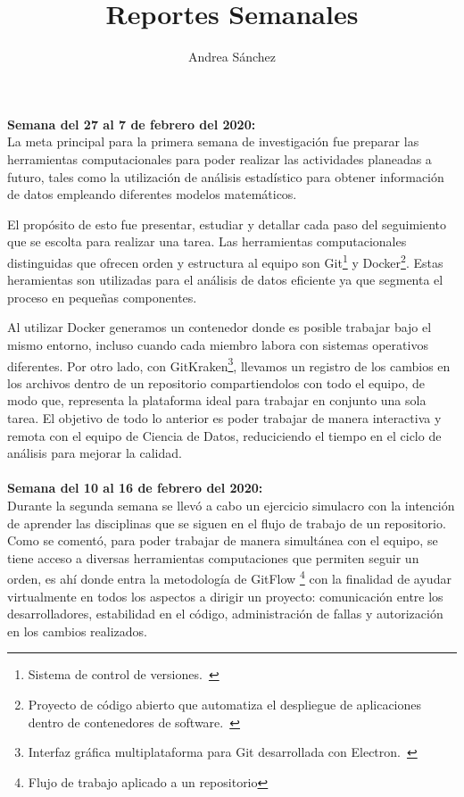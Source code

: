 \documentclass{article}
\title{Reportes Semanales}
\author{Andrea Sánchez}
\begin{document}
\maketitle
    \textbf{Semana del 27 al 7 de febrero del 2020:} \\
    La meta principal para la primera semana de investigación fue preparar las herramientas computacionales para poder realizar las actividades planeadas a futuro, tales como la utilización de análisis estadístico para obtener información de datos empleando diferentes modelos matemáticos.

    El propósito de esto fue presentar, estudiar y detallar cada paso del seguimiento que se escolta para realizar una tarea. Las herramientas computacionales distinguidas que ofrecen orden y estructura al equipo son Git\footnote{Sistema de control de versiones.~\cite{bergh2019}} y Docker\footnote{Proyecto de código abierto que automatiza el despliegue de aplicaciones dentro de contenedores de software.~\cite{bergh2019}}.
        Estas heramientas son utilizadas para el análisis de datos eficiente ya que segmenta el proceso en pequeñas componentes.

    Al utilizar Docker generamos un contenedor donde es posible trabajar bajo el mismo entorno, incluso cuando cada miembro labora con sistemas operativos diferentes. Por otro lado, con GitKraken\footnote{Interfaz gráfica multiplataforma para Git desarrollada con Electron.~\cite{bergh2019}}, llevamos un registro de los cambios en los archivos dentro de un repositorio compartiendolos con todo el equipo, de modo que, representa la plataforma ideal para trabajar en conjunto una sola tarea.
    El objetivo de todo lo anterior es poder trabajar de manera interactiva y remota con el equipo de Ciencia de Datos, reduciciendo el tiempo en el ciclo de análisis para mejorar la calidad.
\\ \\ 
    \textbf{Semana del 10 al 16 de febrero del 2020:} \\
    Durante la segunda semana se llevó a cabo un ejercicio simulacro con la intención de aprender las disciplinas que se siguen en el flujo de trabajo de un repositorio. Como se comentó, para poder trabajar de manera simultánea con el equipo, se tiene acceso a diversas herramientas computaciones que permiten seguir un orden, es ahí donde entra la metodología de GitFlow \footnote{Flujo de trabajo aplicado a un repositorio} con la finalidad de ayudar virtualmente en todos los aspectos a dirigir un proyecto: comunicación entre los desarrolladores, estabilidad en el código, administración de fallas y autorización en los cambios realizados.
\end{document}
